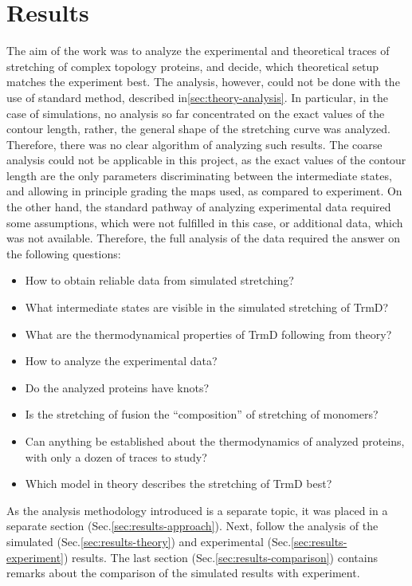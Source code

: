 \chapter{Results}
\label{ch:results}
The aim of the work was to analyze the experimental and theoretical traces of stretching of complex topology proteins, and decide, which theoretical setup matches the experiment best.
The analysis, however, could not be done with the use of standard method, described in\ref{sec:theory-analysis}.
In particular, in the case of simulations, no analysis so far concentrated on the exact values of the contour length, rather, the general shape of the stretching curve was analyzed.
Therefore, there was no clear algorithm of analyzing such results.
The coarse analysis could not be applicable in this project, as the exact values of the contour length are the only parameters discriminating between the intermediate states, and allowing in principle grading the maps used, as compared to experiment.
On the other hand, the standard pathway of analyzing experimental data required some assumptions, which were not fulfilled in this case, or additional data, which was not available.
Therefore, the full analysis of the data required the answer on the following questions:
\begin{itemize}
    \item How to obtain reliable data from simulated stretching?
    \item What intermediate states are visible in the simulated stretching of TrmD?
    \item What are the thermodynamical properties of TrmD following from theory?
    \item How to analyze the experimental data?
    \item Do the analyzed proteins have knots?
    \item Is the stretching of fusion the ``composition'' of stretching of monomers?
    \item Can anything be established about the thermodynamics of analyzed proteins, with only a dozen of traces to study?
    \item Which model in theory describes the stretching of TrmD best?
\end{itemize}

As the analysis methodology introduced is a separate topic, it was placed in a separate section (Sec.\ref{sec:results-approach}).
Next, follow the analysis of the simulated (Sec.\ref{sec:results-theory}) and experimental (Sec.\ref{sec:results-experiment}) results.
The last section (Sec.\ref{sec:results-comparison}) contains remarks about the comparison of the simulated results with experiment.


